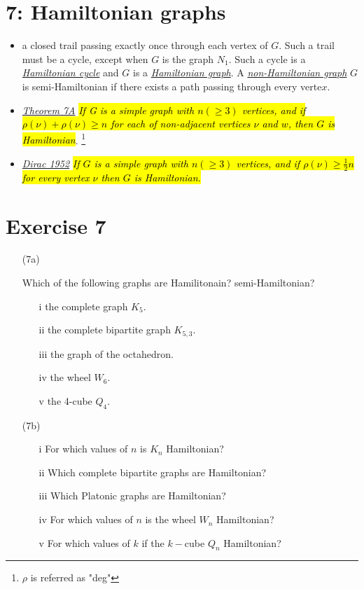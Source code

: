 \documentclass[12pt,a4paper, twocolumn]{article}
\begin{document}
\section*{7: Hamiltonian graphs}
\begin{itemize}
		\item a closed trail passing exactly once through each vertex of $G$. Such a trail must be a cycle, except when $G$ is the graph $N_1$. Such a cycle is a \underline{\emph{\color{magenta} Hamiltonian cycle}} and $G$ is a \underline{\emph{\color{magenta} Hamiltonian graph}}. A \underline{\emph{\color{magenta} non-Hamiltonian graph}} $G$ is semi-Hamiltonian if there exists a path passing through every verte$x$.
		\item \underline{\emph{\color{magenta} Theorem 7A}} \hl{\emph{If G is a simple graph with $n(\geq3)$ vertices, and if $\rho(\nu) + \rho(\nu) \geq n$ for each of non-adjacent vertices $\nu$ and $w$, then $G$ is Hamiltonian}}. \footnote{$\rho$ is referred as "deg"} 
		\item \underline{\emph{\color{magenta} Dirac 1952}} \hl{\emph{If $G$ is a simple graph with $n(\geq3)$ vertices, and if $\rho(\nu) \geq \frac{1}{2} n$ for every vertex $\nu$ then $G$ is Hamiltonian.}}
\end{itemize}

\section*{Exercise 7}
\begin{itemize}
		\item[(7a)] {\color{blue} Which of the following graphs are Hamilitonain? semi-Hamiltonian?
			\begin{itemize}
				\item[i] the complete graph $K_5$.
				\item[ii] the complete bipartite graph $K_{5,3}$.
				\item[iii] the graph of the octahedron.
				\item[iv] the wheel $W_6$.
				\item[v] the 4-cube $Q_4$.
			\end{itemize}
			}
			\hsplit
	\item[(7b)] {\color{blue}
			\begin{itemize}
				\item[i] For which values of $n$ is $K_n$ Hamiltonian?
				\item[ii] Which complete bipartite graphs are Hamiltonian?
				\item[iii] Which Platonic graphs are Hamiltonian?
				\item[iv] For which values of $n$ is the wheel $W_n$ Hamiltonian?
				\item[v] For which values of $k$ if the $k-$cube $Q_n$ Hamiltonian?
			\end{itemize}	
			}
\end{itemize}
\end{document}
